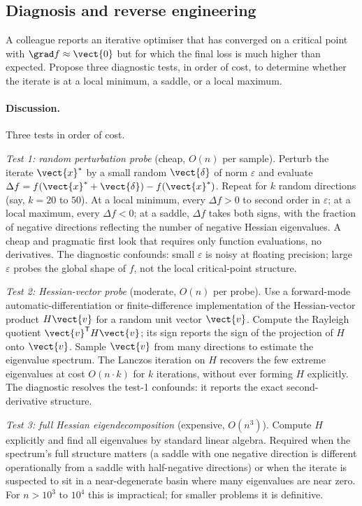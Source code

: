 \subsection*{Diagnosis and reverse engineering}

\begin{exercise}
A colleague reports an iterative optimiser that has converged on a
critical point with $\grad f \approx \vect{0}$ but for which the
final loss is much higher than expected. Propose three diagnostic
tests, in order of cost, to determine whether the iterate is at a
local minimum, a saddle, or a local maximum.

\paragraph{Discussion.} Three tests in order of cost.

\textit{Test 1: random perturbation probe} (cheap, $O(n)$ per
sample). Perturb the iterate $\vect{x}^{*}$ by a small random
$\vect{\delta}$ of norm $\varepsilon$ and evaluate $\Delta f =
f(\vect{x}^{*} + \vect{\delta}) - f(\vect{x}^{*})$. Repeat for $k$
random directions (say, $k = 20$ to $50$). At a local minimum,
every $\Delta f > 0$ to second order in $\varepsilon$; at a local
maximum, every $\Delta f < 0$; at a saddle, $\Delta f$ takes both
signs, with the fraction of negative directions reflecting the
number of negative Hessian eigenvalues. A cheap and pragmatic first
look that requires only function evaluations, no derivatives. The
diagnostic confounds: small $\varepsilon$ is noisy at floating
precision; large $\varepsilon$ probes the global shape of $f$, not
the local critical-point structure.

\textit{Test 2: Hessian-vector probe} (moderate, $O(n)$ per probe).
Use a forward-mode automatic-differentiation or finite-difference
implementation of the Hessian-vector product $H \vect{v}$ for a
random unit vector $\vect{v}$. Compute the Rayleigh quotient
$\vect{v}^{\mathsf{T}} H \vect{v}$; its sign reports the sign of
the projection of $H$ onto $\vect{v}$. Sample $\vect{v}$ from many
directions to estimate the eigenvalue spectrum. The Lanczos
iteration on $H$ recovers the few extreme eigenvalues at cost
$O(n \cdot k)$ for $k$ iterations, without ever forming $H$
explicitly. The diagnostic resolves the test-1 confounds: it
reports the exact second-derivative structure.

\textit{Test 3: full Hessian eigendecomposition} (expensive, $O(n^{3})$).
Compute $H$ explicitly and find all eigenvalues by standard linear
algebra. Required when the spectrum's full structure matters (a
saddle with one negative direction is different operationally from
a saddle with half-negative directions) or when the iterate is
suspected to sit in a near-degenerate basin where many eigenvalues
are near zero. For $n > 10^{3}$ to $10^{4}$ this is impractical;
for smaller problems it is definitive.


\end{exercise}
